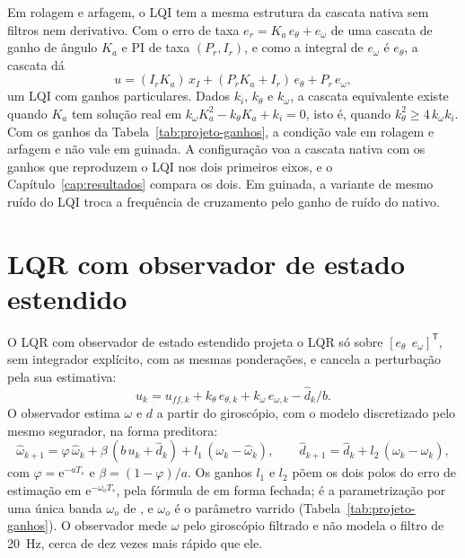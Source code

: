 Em rolagem e arfagem, o LQI tem a mesma estrutura da cascata nativa sem
filtros nem derivativo. Com o erro de taxa $e_r = K_a\,e_\theta + e_\omega$ de
uma cascata de ganho de ângulo $K_a$ e PI de taxa $(P_r, I_r)$, e como a
integral de $e_\omega$ é $e_\theta$, a cascata dá
\begin{equation}
u = (I_r K_a)\,x_I + (P_r K_a + I_r)\,e_\theta + P_r\,e_\omega,
\label{eq:cascata-lqi}
\end{equation}
um LQI com ganhos particulares. Dados $k_i$, $k_\theta$ e $k_\omega$, a
cascata equivalente existe quando $K_a$ tem solução real em
$k_\omega K_a^2 - k_\theta K_a + k_i = 0$, isto é, quando
$k_\theta^2 \ge 4\,k_\omega k_i$. Com os ganhos da
Tabela~\ref{tab:projeto-ganhos}, a condição vale em rolagem e arfagem e não
vale em guinada. A configuração  voa a cascata nativa com
os ganhos que reproduzem o LQI nos dois primeiros eixos, e o
Capítulo~\ref{cap:resultados} compara os dois. Em guinada, a variante de
mesmo ruído do LQI troca a frequência de cruzamento pelo ganho de ruído do
nativo.

\section{LQR com observador de estado estendido}
\label{sec:projeto-eso}

O LQR com observador de estado estendido projeta o LQR só sobre
$[e_\theta\ \ e_\omega]^{\mathsf{T}}$, sem integrador explícito, com as mesmas
ponderações, e cancela a perturbação pela sua estimativa:
\begin{equation}
u_k = u_{ff,k} + k_\theta\,e_{\theta,k} + k_\omega\,e_{\omega,k}
      - \hat d_k/b.
\label{eq:lei-eso}
\end{equation}
O observador estima $\omega$ e $d$ a partir do giroscópio, com o modelo
discretizado pelo mesmo segurador, na forma preditora:
\begin{equation}
\hat\omega_{k+1} = \varphi\,\hat\omega_k + \beta\,(b\,u_k + \hat d_k)
                 + l_1\,(\omega_k - \hat\omega_k), \qquad
\hat d_{k+1} = \hat d_k + l_2\,(\omega_k - \hat\omega_k),
\label{eq:eso-discreto}
\end{equation}
com $\varphi = \mathrm{e}^{-aT_s}$ e $\beta = (1 - \varphi)/a$. Os ganhos $l_1$
e $l_2$ põem os dois polos do erro de estimação em
$\mathrm{e}^{-\omega_o T_s}$, pela fórmula de
 em forma fechada; é a parametrização por uma única
banda $\omega_o$ de , e $\omega_o$ é o parâmetro varrido
(Tabela~\ref{tab:projeto-ganhos}). O observador mede $\omega$ pelo giroscópio
filtrado e não modela o filtro de \SI{20}{\hertz}, cerca de dez vezes mais
rápido que ele.

